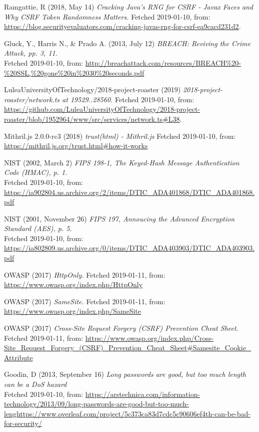 \documentclass[12pt,a4paper]{report}
\begin{document}
\newpage
\apptocmd{\sloppy}{\hbadness 10000\relax}{}{} 
{\RaggedRight\begin{thebibliography}{1}

Ramgattie, R (2018, May 14) {\em  Cracking Java’s RNG for CSRF - Javax Faces and Why CSRF Token Randomness Matters.}
Fetched 2019-01-10, from:
\url{https://blog.securityevaluators.com/cracking-javas-rng-for-csrf-ea9cacd231d2}.

Gluck, Y., Harris N., \& Prado A. (2013, July 12) {\em BREACH: Reviving the Crime Attack, pp. 3, 11.} \\
Fetched 2019-01-10, from:
\url{http://breachattack.com/resources/BREACH%20-%20SSL,%20gone%20in%2030%20seconds.pdf}

LuleaUniversityOfTechnology/2018-project-roaster (2019) {\em 2018-project-roaster/network.ts at 19529..28560.}
Fetched 2019-01-10, from:
\url{https://github.com/LuleaUniversityOfTechnology/2018-project-roaster/blob/1952964/www/src/services/network.ts#L38}.

Mithril.js 2.0.0-rc3 (2018) {\em trust(html) - Mithril.js}
Fetched 2019-01-10, from:
\url{https://mithril.js.org/trust.html#how-it-works}

NIST (2002, March 2) {\em FIPS 198-1, The Keyed-Hash Message Authentication Code (HMAC), p. 1.} \\
Fetched 2019-01-10, from:
\url{https://ia902804.us.archive.org/2/items/DTIC_ADA401868/DTIC_ADA401868.pdf}

NIST (2001, November 26) {\em FIPS 197, Annoucing the Advanced Encryption Standard (AES), p. 5.} \\
Fetched 2019-01-10, from:
\url{https://ia802809.us.archive.org/0/items/DTIC_ADA403903/DTIC_ADA403903.pdf}

OWASP (2017) {\em HttpOnly.} Fetched 2019-01-11, from:
\url{https://www.owasp.org/index.php/HttpOnly}

OWASP (2017) {\em SameSite.} Fetched 2019-01-11, from:
\url{https://www.owasp.org/index.php/SameSite}

OWASP (2017) {\em Cross-Site Request Forgery (CSRF) Prevention Cheat Sheet.} Fetched 2019-01-11, from:
\url{https://www.owasp.org/index.php/Cross-Site_Request_Forgery_(CSRF)_Prevention_Cheat_Sheet#Samesite_Cookie_Attribute}

Goodin, D (2013, September 16) {\em Long passwords are good, but too much length can be a DoS hazard} \\
Fetched 2019-01-10, from:
\url{https://arstechnica.com/information-technology/2013/09/long-passwords-are-good-but-too-much-lenghttps://www.overleaf.com/project/5c373ca83d7cdc5c90606ef4th-can-be-bad-for-security/}


\end{thebibliography}}
\end{document}
